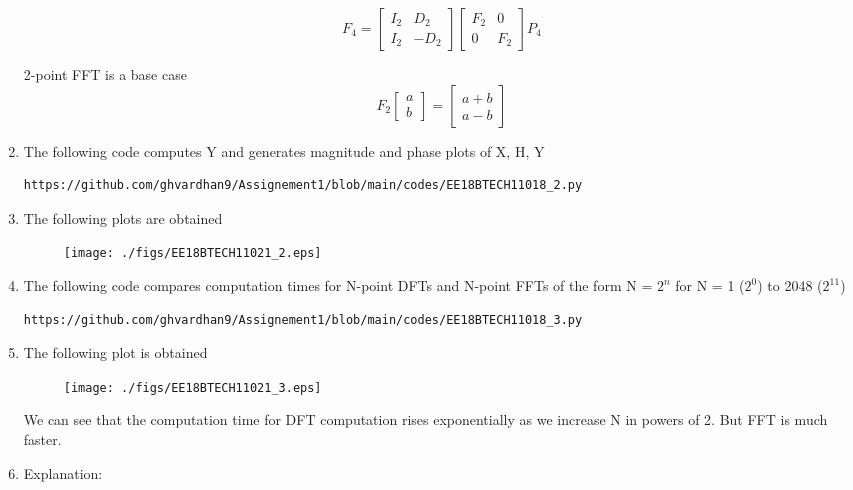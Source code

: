 \documentclass[journal,12pt,twocolumn]{IEEEtran}
\renewcommand\thesection{\arabic{section}}
\begin{document}
\begin{enumerate}[label=\thesection.\arabic*.,ref=\thesection.\theenumi]
\begin{equation}
F_{4}=
\begin{bmatrix}
I_{2} & D_{2} \\
I_{2} & -D_{2}
\end{bmatrix}
\begin{bmatrix}
F_{2} & 0 \\
0 & F_{2}
\end{bmatrix}
P_{4}
\end{equation}

2-point FFT is a base case
\begin{equation}
F_{2}
\begin{bmatrix}
a \\
b
\end{bmatrix}
=
\begin{bmatrix}
a+b \\
a-b
\end{bmatrix}
\end{equation}

\item The following code computes Y and generates magnitude and phase plots of X, H, Y
\begin{lstlisting}
https://github.com/ghvardhan9/Assignement1/blob/main/codes/EE18BTECH11018_2.py
\end{lstlisting}

\item The following plots are obtained
\begin{figure}[!ht]
	\texttt{[image: ./figs/EE18BTECH11021\_2.eps]}
\end{figure}

\item The following code compares computation times for N-point DFTs and N-point FFTs of the form N = $2^{n}$ for N = 1 ($2^{0}$) to 2048 ($2^{11}$)
\begin{lstlisting}
https://github.com/ghvardhan9/Assignement1/blob/main/codes/EE18BTECH11018_3.py
\end{lstlisting}

\item The following plot is obtained
\begin{figure}[!ht]
	\texttt{[image: ./figs/EE18BTECH11021\_3.eps]}
\end{figure}

We can see that the computation time for DFT computation rises exponentially as we increase N in powers of 2. 
But FFT is much faster.

\item Explanation:


\end{enumerate}
\end{document}

